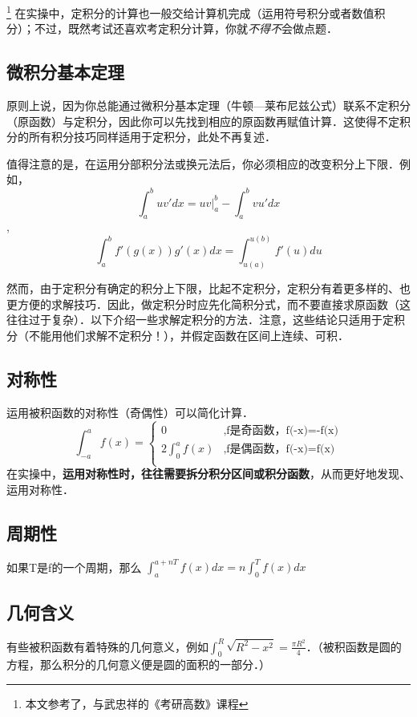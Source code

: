 
\begin{issues}
\issueDraft
\end{issues}
\footnote{本文参考了\cite{同济高}，\cite{Thomas}与武忠祥的《考研高数》课程}
在实操中，定积分的计算也一般交给计算机完成（运用符号积分或者数值积分）；不过，既然考试还喜欢考定积分计算，你就\textsl{不得不}会做点题．

\subsection{微积分基本定理}
原则上说，因为你总能通过微积分基本定理（牛顿—莱布尼兹公式）联系不定积分（原函数）与定积分，因此你可以先找到相应的原函数再赋值计算．这使得不定积分的所有积分技巧同样适用于定积分，此处不再复述．

值得注意的是，在运用分部积分法或换元法后，你必须相应的改变积分上下限．例如，$$\int^b_a uv'dx = uv|^b_a-\int^b_a vu'dx$$, 
$$\int^b_a f'(g(x))g'(x)dx = \int ^{u(b)}_{u(a)} f'(u)du$$

然而，由于定积分有确定的积分上下限，比起不定积分，定积分有着更多样的、也更方便的求解技巧．因此，做定积分时应先化简积分式，而不要直接求原函数（这往往过于复杂）．以下介绍一些求解定积分的方法．注意，这些结论只适用于定积分（不能用他们求解不定积分！），并假定函数在区间上连续、可积．

\subsection{对称性}
运用被积函数的对称性（奇偶性）可以简化计算．
$$
\int ^a_{-a} f(x) = 
\left \{
\begin{aligned}
0&,\text{f是奇函数，f(-x)=-f(x)}\\
2\int ^a_0 f(x)&,\text{f是偶函数，f(-x)=f(x)}\\
\end{aligned}
\right.
$$
在实操中，\textbf{运用对称性时，往往需要拆分积分区间或积分函数}，从而更好地发现、运用对称性．

\subsection{周期性}
如果T是f的一个周期，那么 $\int ^{a+nT}_{a} f(x)dx= n\int^{T}_0 f(x)dx$

\subsection{几何含义}
有些被积函数有着特殊的几何意义，例如$\int ^R_0 \sqrt{R^2-x^2}=\frac{\pi R^2}{4}$．（被积函数是圆的方程，那么积分的几何意义便是圆的面积的一部分．）

